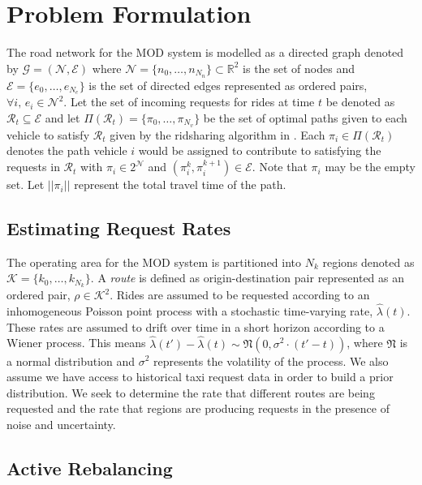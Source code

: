 \documentclass[letterpaper, 10pt, conference]{ieeeconf}
\begin{document}
\section{Problem Formulation}

The road network for the MOD system is modelled as a directed graph denoted by
$\mathcal{G} = (\mathcal{N}, \mathcal{E})$ where $\mathcal{N} = \{n_0, \ldots,
n_{N_n}\} \subset \mathbb{R}^2$ is the set of nodes and $\mathcal{E} = \{e_0,
\ldots, e_{N_e}\}$ is the set of directed edges represented as ordered pairs,
$\forall i,\, e_i \in \mathcal{N}^2$. Let the set of incoming requests for
rides at time $t$ be denoted as $\mathcal{R}_{t} \subseteq \mathcal{E}$ and let
$\Pi(\mathcal{R}_t) = \{\pi_0, \ldots, \pi_{N_v}\}$ be the set of optimal paths
given to each vehicle to satisfy $\mathcal{R}_t$ given by the ridsharing
algorithm in \cite{alonsomora16pnas}. Each $\pi_i \in \Pi(\mathcal{R}_t)$
denotes the path vehicle $i$ would be assigned to contribute to satisfying the
requests in $\mathcal{R}_t$ with $\pi_i \in 2^{\mathcal{N}}$ and $(\pi^k_i,
\pi^{k + 1}_i) \in \mathcal{E}$. Note that $\pi_i$ may be the empty set. Let
$||\pi_i||$ represent the total travel time of the path.

\subsection{Estimating Request Rates}

The operating area for the MOD system is partitioned into $N_{k}$ regions
denoted as $\mathcal{K} = \{k_0, \ldots, k_{N_k}\}$. A \emph{route} is defined
as origin-destination pair represented as an ordered pair, $\rho \in
\mathcal{K}^2$. Rides are assumed to be requested according to an inhomogeneous
Poisson point process with a stochastic time-varying rate, $\hat{\lambda}(t)$.
These rates are assumed to drift over time in a short horizon according to a
Wiener process.  This means $\hat\lambda(t') - \hat\lambda(t)
\sim \mathfrak{N}(0, \sigma^2 \cdot (t' - t))$, where $\mathfrak{N}$ is a
normal distribution and $\sigma^2$ represents the volatility of the process. We
also assume we have access to historical taxi request data in order to build a
prior distribution.  We seek to determine the rate that different routes are
being requested and the rate that regions are producing requests in the
presence of noise and uncertainty.

\subsection{Active Rebalancing}
\end{document}
